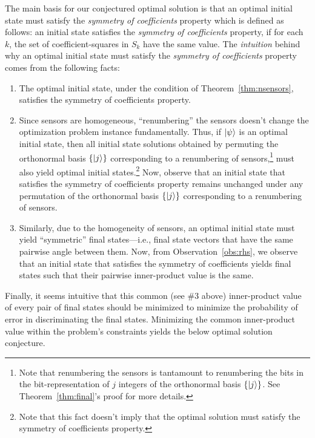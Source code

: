 The main basis for our conjectured optimal solution is that an 
optimal initial state
must satisfy the {\em symmetry of coefficients} property which is defined as
follows: an initial state satisfies the {\em symmetry of coefficients} property, if for each $k$, the set of coefficient-squares in $S_k$ have the same value.
The {\em intuition} behind why an optimal initial state must satisfy the 
{\em symmetry of coefficients} property comes from the following facts: 
\begin{enumerate}
\item 
The optimal initial state, under the condition of Theorem~\ref{thm:nsensors}, satisfies the symmetry of coefficients property. 

\item
Since sensors are homogeneous, ``renumbering'' the 
sensors doesn't change the optimization problem 
instance fundamentally. 
Thus, if $\ket{\psi}$ is an optimal initial state, then all initial
state solutions obtained by permuting the orthonormal 
basis $\{\ket{j}\}$ corresponding to a renumbering of 
sensors,\footnote{Note that renumbering the sensors is tantamount to
renumbering the bits in the bit-representation of $j$ integers
of the orthonormal basis $\{\ket{j}\}$. 
See Theorem~\ref{thm:final}'s proof for more details.}
must also yield optimal initial 
states.\footnote{Note that this fact doesn't imply that the optimal solution must satisfy the 
symmetry of coefficients property.}
Now, observe that an initial state that satisfies
the symmetry of coefficients property remains unchanged under 
any permutation of the orthonormal 
basis $\{\ket{j}\}$ corresponding to a renumbering of sensors.

\item 
Similarly, due to the homogeneity of sensors, an optimal initial state 
must yield ``symmetric'' final states---i.e., final 
state vectors that have the same pairwise angle between them.
Now, from Observation~\ref{obs:rhs}, we observe that
an initial state that satisfies the symmetry of coefficients yields
final states such that their pairwise inner-product value is the same.
\end{enumerate}
Finally, it seems intuitive that this common (see \#3 above) 
inner-product value of every pair of final 
states should be minimized to minimize the probability of error in discriminating the final states. Minimizing the common inner-product value within the problem's constraints yields the below optimal solution conjecture.

